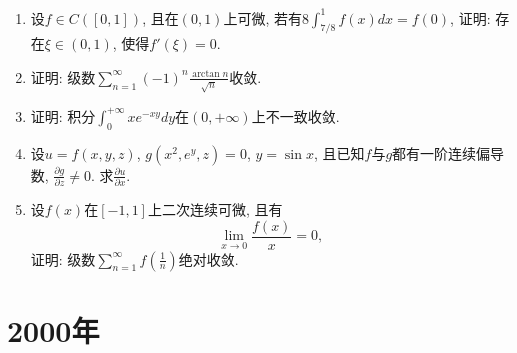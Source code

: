 \documentclass[12pt,a4paper,openany]{book}
\begin{document}
\begin{enumerate}
\begin{enumerate}
\item 设$f \in C([0, 1])$, 且在$(0, 1)$上可微, 若有$8\displaystyle\int_{7/8}^{1}{f(x)dx} = f(0)$, 证明: 存在$\xi \in (0, 1)$, 使得$f'(\xi) = 0$.

\item 证明: 级数$\sum\limits_{n=1}^{\infty}{(-1)^n\frac{\arctan{n}}{\sqrt{n}}}$收敛.

\item 证明: 积分$\displaystyle\int_{0}^{+\infty}{xe^{-xy}dy}$在$(0, +\infty)$上不一致收敛.

\item 设$u = f(x, y, z)$, $g(x^2, e^y, z) = 0$, $y = \sin{x}$, 且已知$f$与$g$都有一阶连续偏导数, $\displaystyle\frac{\partial{g}}{\partial{z}} \neq 0$. 求$\displaystyle\frac{\partial{u}}{\partial{x}}$.

\item 设$f(x)$在$[-1, 1]$上二次连续可微, 且有
\[
\lim_{x \rightarrow 0}{\frac{f(x)}{x}} = 0,
\]
证明: 级数$\displaystyle\sum\limits_{n=1}^{\infty}{f(\frac{1}{n})}$绝对收敛.
\end{enumerate}

\end{enumerate}

\section{2000年}
\end{document}
